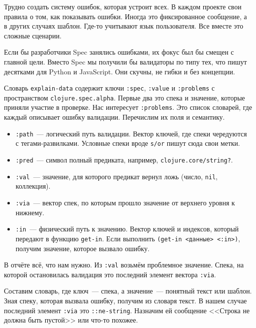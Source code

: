 Трудно создать систему ошибок, которая устроит всех. В каждом проекте свои
правила о том, как показывать ошибки. Иногда это фиксированное сообщение, а в
других случаях шаблон. Где-то учитывают язык пользователя. Все вместе это
сложные сценарии.

Если бы разработчики Spec занялись ошибками, их фокус был бы смещен с главной
цели. Вместо Spec мы получили бы валидаторы по типу тех, что пишут десятками для
Python и JavaScript. Они скучны, не гибки и без концепции.

Словарь \verb|explain-data| содержит ключи \verb|:spec|, \verb|:value| и
\verb|:problems| с пространством \verb|clojure.spec.alpha|. Первые два это
спека и значение, которые приняли участие в проверке. Нас интересует
\verb|:problems|. Это список словарей, где каждый описывает ошибку
валидации. Перечислим их поля и семантику.


\begin{itemize}

\item
  \verb|:path|~--- логический путь валидации. Вектор ключей, где спеки
  чередуются с тегами-развилками. Условные спеки вроде \verb|s/or| пишут сюда
  свои метки.

\item
  \verb|:pred|~--- символ полный предиката, например,
  \verb|clojure.core/string?|.

\item
  \verb|:val|~--- значение, для которого предикат вернул ложь (число,
  \verb|nil|, коллекция).

\item
  \verb|:via|~--- вектор спек, по которым прошло значение от верхнего уровня к
  нижнему.

\item
  \verb|:in|~--- физический путь к значению. Вектор ключей и индексов, который
  передают в функцию \verb|get-in|. Если выполнить \verb|(get-in <данные> <:in>)|,
  получим значение, которое вызвало ошибку.

\end{itemize}

В отчёте всё, что нам нужно. Из \verb|:val| возьмём проблемное
значение. Спека, на которой остановилась валидация это последний элемент вектора
\verb|:via|.

Составим словарь, где ключ~--- спека, а значение~--- понятный текст или
шаблон. Зная спеку, которая вызвала ошибку, получим из словаря текст. В нашем
случае последний элемент \verb|:via| это \verb|::ne-string|. Назначим ей
сообщение <<Строка не должна быть пустой>> или что-то похожее.

